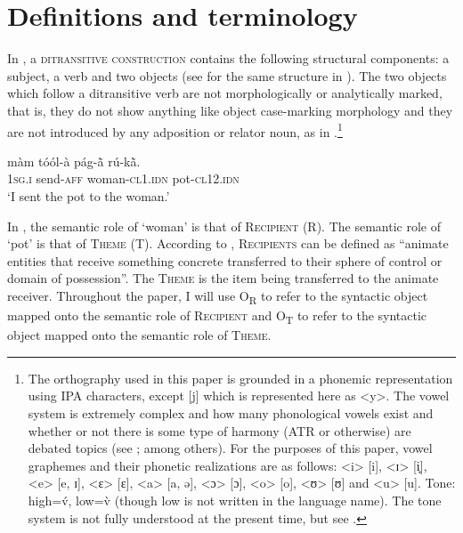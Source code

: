 \documentclass[output=paper]{langsci/langscibook}
\begin{document}
\section{Definitions and terminology}\label{§2:definitions.pacchiarotti}
\largerpage[-2]
In , a \textsc{ditransitive construction} contains the following structural components: a subject, a verb and two objects (see \citealt{olawsky1999} for the same structure in ). The two objects which follow a ditransitive verb are not morphologically or analytically marked, that is, they do not show anything like object case-marking morphology and they are not introduced by any adposition or relator noun, as in .\footnote{The  orthography used in this paper is grounded in a phonemic representation using IPA characters, except [j] which is represented here as {\textless}y>. The vowel system is extremely complex and how many phonological vowels exist and whether or not there is some type of harmony (ATR or otherwise) are debated topics (see \citealt{peterson1971,canu1974,rennison1990,nikiema2000,calamaibertinetto2005}; among others). For the purposes of this paper, vowel graphemes and their phonetic realizations are as follows: {\textless}i> [i], {\textless}ɪ> [i̙], {\textless}e> [e, ɪ], {\textless}ɛ> [ɛ], {\textless}a> [a, ə], {\textless}ɔ> [ɔ], {\textless}o> [o], {\textless}ʊ> [ʊ] and {\textless}u> [u]. Tone: high=\'{v}, low=\`{v} (though low is not written in the language name). The tone system is not fully understood at the present time, but see \citet{peterson1971}.}

\ea
\label{ex:pacchiarotti:1}
\gll màm    tóól-à        pág-\`{ã}             rú-k\`{ã}.\\
\textsc{1sg.i}    send-\textsc{aff}      woman-\textsc{cl1.idn}       pot-\textsc{cl12.idn} \\
\glt `I sent the pot to the woman.'  
\z

In , the semantic role of `woman' is that of \textsc{Recipient} (R).  The semantic role of `pot' is that of \textsc{Theme} (T). According to \citet[274]{kittila2005}, \textsc{Recipients} can be defined as ``animate entities that receive something concrete transferred to their sphere of control or domain of possession''. The \textsc{Theme} is the item being transferred to the animate receiver. Throughout the paper, I will use O\textsubscript{R} to refer to the syntactic object mapped onto the semantic role of \textsc{Recipient} and O\textsubscript{T} to refer to the syntactic object mapped onto the semantic role of \textsc{Theme}. 
\end{document}
